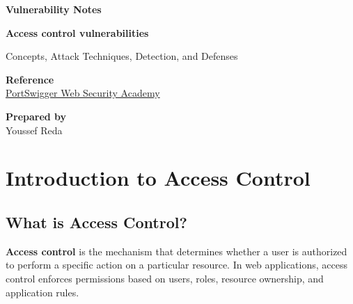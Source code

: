 \documentclass[11pt,a4paper]{article}
\newcommand{\DocumentType}{Vulnerability Notes}
\newcommand{\VulnerabilityTitle}{Access control vulnerabilities}
\newcommand{\SourceName}{PortSwigger Web Security Academy}
\newcommand{\SourceURL}{https://portswigger.net/web-security/access-control}
\newcommand{\AuthorName}{Youssef Reda}
\begin{document}

\hypersetup{pageanchor=false}
\begin{titlepage}
    \thispagestyle{empty}

    \centering

    \vspace*{1.8cm}

    {\Large\color{secondary}\bfseries \DocumentType\par}
    \vspace{1.2cm}

    {\Huge\bfseries\color{primary}\VulnerabilityTitle\par}
    \vspace{0.8cm}

    {\large Concepts, Attack Techniques, Detection, and Defenses\par}

    \vfill

    \begin{flushleft}
        \textbf{Reference}\\
        \href{\SourceURL}{\SourceName}

        \vspace{0.6cm}

        \textbf{Prepared by}\\
        \AuthorName
    \end{flushleft}
\end{titlepage}
\hypersetup{pageanchor=true}

\tableofcontents
\clearpage
{}


\section{Introduction to Access Control}

\subsection{What is Access Control?}

\textbf{Access control} is the mechanism that determines whether a user is authorized to perform a specific action on a particular resource.
In web applications, access control enforces permissions based on users, roles, resource ownership, and application rules.
\end{document}
